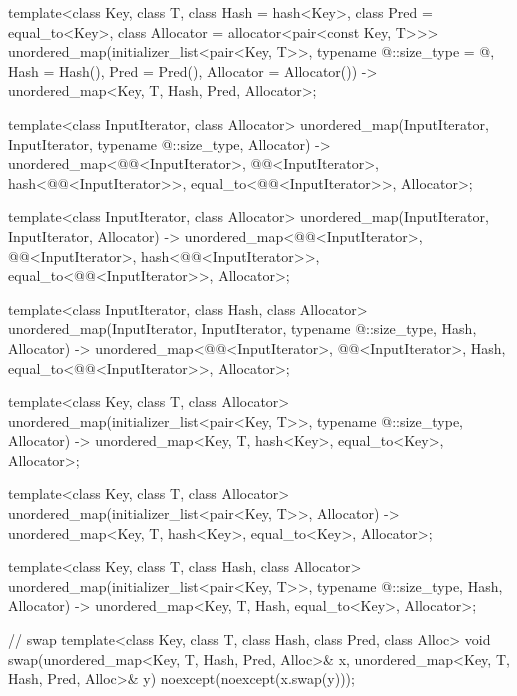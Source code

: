 \begin{codeblock}
{  template<class Key, class T, class Hash = hash<Key>,
           class Pred = equal_to<Key>, class Allocator = allocator<pair<const Key, T>>>
    unordered_map(initializer_list<pair<Key, T>>,
                  typename @\seebelow@::size_type = @\seebelow@, Hash = Hash(),
                  Pred = Pred(), Allocator = Allocator())
      -> unordered_map<Key, T, Hash, Pred, Allocator>;

  template<class InputIterator, class Allocator>
    unordered_map(InputIterator, InputIterator, typename @\seebelow@::size_type, Allocator)
      -> unordered_map<@@<InputIterator>, @@<InputIterator>,
                       hash<@@<InputIterator>>,
                       equal_to<@@<InputIterator>>, Allocator>;

  template<class InputIterator, class Allocator>
    unordered_map(InputIterator, InputIterator, Allocator)
      -> unordered_map<@@<InputIterator>, @@<InputIterator>,
                       hash<@@<InputIterator>>,
                       equal_to<@@<InputIterator>>, Allocator>;

  template<class InputIterator, class Hash, class Allocator>
    unordered_map(InputIterator, InputIterator, typename @\seebelow@::size_type, Hash, Allocator)
      -> unordered_map<@@<InputIterator>, @@<InputIterator>, Hash,
                       equal_to<@@<InputIterator>>, Allocator>;

  template<class Key, class T, class Allocator>
    unordered_map(initializer_list<pair<Key, T>>, typename @\seebelow@::size_type,
                  Allocator)
      -> unordered_map<Key, T, hash<Key>, equal_to<Key>, Allocator>;

  template<class Key, class T, class Allocator>
    unordered_map(initializer_list<pair<Key, T>>, Allocator)
      -> unordered_map<Key, T, hash<Key>, equal_to<Key>, Allocator>;

  template<class Key, class T, class Hash, class Allocator>
    unordered_map(initializer_list<pair<Key, T>>, typename @\seebelow@::size_type, Hash,
                  Allocator)
      -> unordered_map<Key, T, Hash, equal_to<Key>, Allocator>;

  // swap
  template<class Key, class T, class Hash, class Pred, class Alloc>
    void swap(unordered_map<Key, T, Hash, Pred, Alloc>& x,
              unordered_map<Key, T, Hash, Pred, Alloc>& y)
      noexcept(noexcept(x.swap(y)));
}
\end{codeblock}

